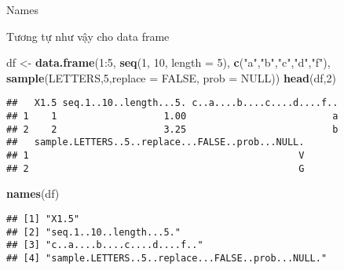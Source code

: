 \documentclass[
  ignorenonframetext,
]{beamer}
\newenvironment{Shaded}{}{}
\newcommand{\DataTypeTok}[1]{\textcolor[rgb]{0.56,0.13,0.00}{#1}}
\newcommand{\DecValTok}[1]{\textcolor[rgb]{0.25,0.63,0.44}{#1}}
\newcommand{\KeywordTok}[1]{\textcolor[rgb]{0.00,0.44,0.13}{\textbf{#1}}}
\newcommand{\NormalTok}[1]{#1}
\newcommand{\OperatorTok}[1]{\textcolor[rgb]{0.40,0.40,0.40}{#1}}
\newcommand{\OtherTok}[1]{\textcolor[rgb]{0.00,0.44,0.13}{#1}}
\newcommand{\StringTok}[1]{\textcolor[rgb]{0.25,0.44,0.63}{#1}}
\begin{document}
\begin{frame}[fragile]{Names}
\protect\hypertarget{names-7}{}

Tương tự như vậy cho data frame

\begin{Shaded}
\begin{Highlighting}[]
\NormalTok{df <-}\StringTok{ }\KeywordTok{data.frame}\NormalTok{(}\DecValTok{1}\OperatorTok{:}\DecValTok{5}\NormalTok{,}
                 \KeywordTok{seq}\NormalTok{(}\DecValTok{1}\NormalTok{, }\DecValTok{10}\NormalTok{, }\DataTypeTok{length =} \DecValTok{5}\NormalTok{),}
                 \KeywordTok{c}\NormalTok{(}\StringTok{"a"}\NormalTok{,}\StringTok{"b"}\NormalTok{,}\StringTok{"c"}\NormalTok{,}\StringTok{"d"}\NormalTok{,}\StringTok{"f"}\NormalTok{),}
                 \KeywordTok{sample}\NormalTok{(LETTERS,}\DecValTok{5}\NormalTok{,}\DataTypeTok{replace =} \OtherTok{FALSE}\NormalTok{, }\DataTypeTok{prob =} \OtherTok{NULL}\NormalTok{))}
\KeywordTok{head}\NormalTok{(df,}\DecValTok{2}\NormalTok{)}
\end{Highlighting}
\end{Shaded}

\begin{verbatim}
##   X1.5 seq.1..10..length...5. c..a....b....c....d....f..
## 1    1                   1.00                          a
## 2    2                   3.25                          b
##   sample.LETTERS..5..replace...FALSE..prob...NULL.
## 1                                                V
## 2                                                G
\end{verbatim}

\begin{Shaded}
\begin{Highlighting}[]
\KeywordTok{names}\NormalTok{(df)}
\end{Highlighting}
\end{Shaded}

\begin{verbatim}
## [1] "X1.5"                                            
## [2] "seq.1..10..length...5."                          
## [3] "c..a....b....c....d....f.."                      
## [4] "sample.LETTERS..5..replace...FALSE..prob...NULL."
\end{verbatim}

\end{frame}
\end{document}
